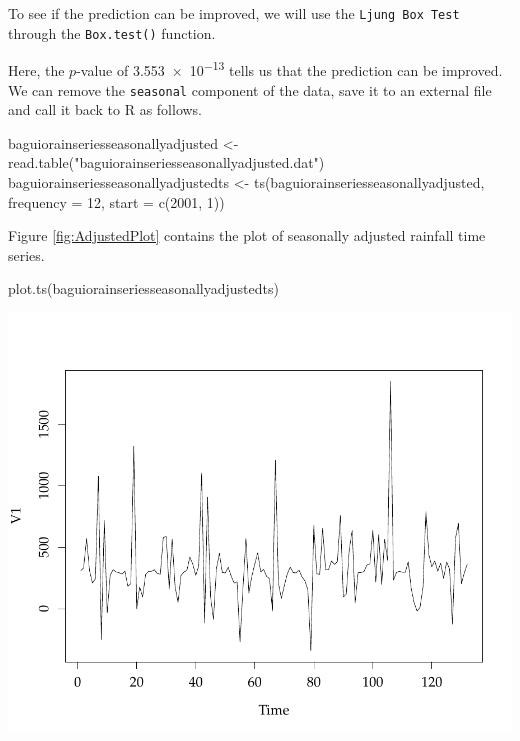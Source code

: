\documentclass{article}\usepackage{graphicx, color}
\begin{document}
To see if the prediction can be improved, we will use the \texttt{Ljung Box Test} through the \texttt{Box.test()} function.

\begin{Schunk}
\end{Schunk}


Here, the $p$-value of \num{3.553e-13} tells us that the prediction can be improved. We can remove the \texttt{seasonal} component of the data, save it to an external file and call it back to \textsf{R} as follows.

\begin{Schunk}
\begin{Sinput}
baguiorainseriesseasonallyadjusted <- read.table("baguiorainseriesseasonallyadjusted.dat")
baguiorainseriesseasonallyadjustedts <- ts(baguiorainseriesseasonallyadjusted, 
    frequency = 12, start = c(2001, 1))
\end{Sinput}
\end{Schunk}


Figure \eqref{fig:AdjustedPlot} contains the plot of seasonally adjusted rainfall time series.

\begin{center}
\begin{Schunk}
\begin{Sinput}
plot.ts(baguiorainseriesseasonallyadjustedts)
\end{Sinput}

\includegraphics[width=.7\textwidth]{figure/listings-AdjustedPlot} \end{Schunk}

\end{center}
\end{document}
